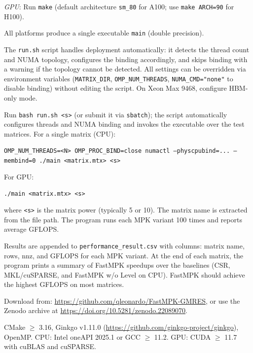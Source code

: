 \documentclass[conference]{IEEEtran}
\begin{document}
\emph{GPU}: Run \texttt{make} (default architecture \texttt{sm\_80} for A100; use \texttt{make ARCH=90} for H100).

All platforms produce a single executable \texttt{main} (double precision).


The \texttt{run.sh} script handles deployment automatically: it detects the thread count and NUMA topology, configures the binding accordingly, and skips binding with a warning if the topology cannot be detected. All settings can be overridden via environment variables (\texttt{MATRIX\_DIR}, \texttt{OMP\_NUM\_THREADS}, \texttt{NUMA\_CMD="none"} to disable binding) without editing the script. On Xeon Max 9468, configure HBM-only mode.

\artcomp

Run \texttt{bash run.sh <s>} (or submit it via \texttt{sbatch}); the script automatically configures threads and NUMA binding and invokes the executable over the test matrices. For a single matrix (CPU):
\begin{center}
\texttt{OMP\_NUM\_THREADS=<N> OMP\_PROC\_BIND=close numactl --physcpubind=... --membind=0 ./main <matrix.mtx> <s>}
\end{center}
For GPU:
\begin{center}
\texttt{./main <matrix.mtx> <s>}
\end{center}
where \texttt{<s>} is the matrix power (typically 5 or 10). The matrix name is extracted from the file path. The program runs each MPK variant 100 times and reports average GFLOPS.

\artout

Results are appended to \texttt{performance\_result.csv} with columns: matrix name, rows, nnz, and GFLOPS for each MPK variant. At the end of each matrix, the program prints a summary of FastMPK speedups over the baselines (CSR, MKL/cuSPARSE, and FastMPK w/o Level on CPU). FastMPK should achieve the highest GFLOPS on most matrices.


\artin


Download from: \url{https://github.com/qleonardo/FastMPK-GMRES}, or use the Zenodo archive at \url{https://doi.org/10.5281/zenodo.22089070}.


CMake $\ge$ 3.16, Ginkgo v1.11.0 (\url{https://github.com/ginkgo-project/ginkgo}), OpenMP. CPU: Intel oneAPI 2025.1 or GCC $\ge$ 11.2. GPU: CUDA $\ge$ 11.7 with cuBLAS and cuSPARSE.
\end{document}
